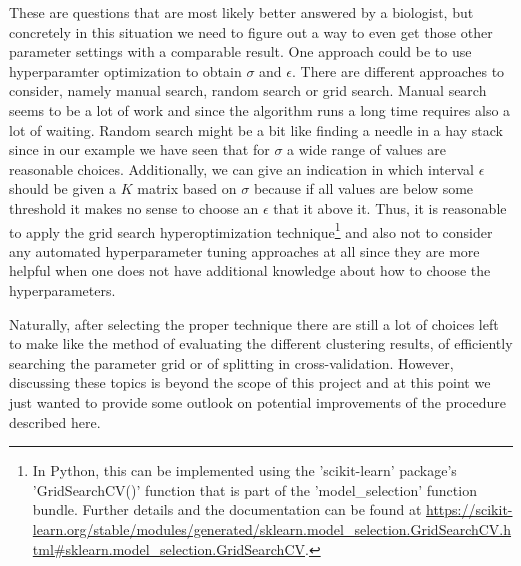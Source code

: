 \documentclass[paper=a4,fontsize=11pt,DIV=8,BCOR=5mm,twoside,pdftex,bibtotocnumbered]{scrreprt}
\theoremstyle{plain}
\begin{document}
These are questions that are most likely better answered by a biologist, but concretely in this situation we need to figure out a way to even get those other parameter settings with a comparable result. One approach could be to use hyperparamter optimization to obtain $\sigma$ and $\epsilon$. There are different approaches to consider, namely manual search, random search or grid search. Manual search seems to be a lot of work and since the algorithm runs a long time requires also a lot of waiting. Random search might be a bit like finding a needle in a hay stack since in our example we have seen that for $\sigma$ a wide range of values are reasonable choices. Additionally, we can give an indication in which interval $\epsilon$ should be given a $K$ matrix based on $\sigma$ because if all values are below some threshold it makes no sense to choose an $\epsilon$ that it above it. Thus, it is reasonable to apply the grid search hyperoptimization technique\footnote{In Python, this can be implemented using the 'scikit-learn' package's 'GridSearchCV()' function that is part of the 'model\_selection' function bundle. Further details and the documentation can be found at \url{https://scikit-learn.org/stable/modules/generated/sklearn.model_selection.GridSearchCV.html\#sklearn.model_selection.GridSearchCV}.} and also not to consider any automated hyperparameter tuning approaches at all since they are more helpful when one does not have additional knowledge about how to choose the hyperparameters. 

Naturally, after selecting the proper technique there are still a lot of choices left to make like the method of evaluating the different clustering results, of efficiently searching the parameter grid or of splitting in cross-validation. However, discussing these topics is beyond the scope of this project and at this point we just wanted to provide some outlook on potential improvements of the procedure described here.



\end{document}
